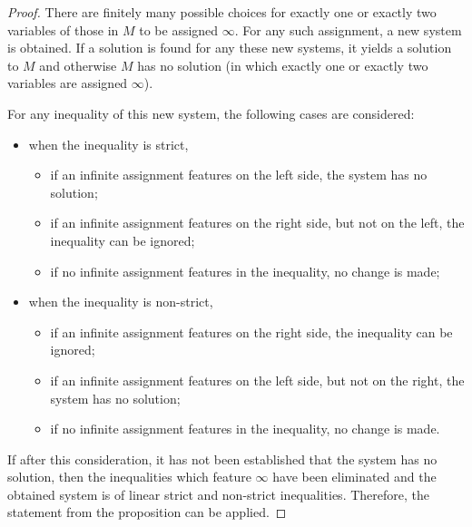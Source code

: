 \documentclass{article}
\begin{document}
\begin{proof}
  There are finitely many possible choices for exactly one or exactly two variables of those in $M$ to be assigned $\infty$. For any such assignment, a new system is obtained. If a solution is found for any these new systems, it yields a solution to $M$ and otherwise $M$ has no solution (in which exactly one or exactly two variables are assigned $\infty$).

  For any inequality of this new system, the following cases are considered:
  \begin{itemize}
  \item when the inequality is strict,
    \begin{itemize}
    \item if an infinite assignment features on the left side, the system has no solution;
    \item if an infinite assignment features on the right side, but not on the left, the inequality can be ignored;
    \item if no infinite assignment features in the inequality, no change is made;
    \end{itemize}
  \item when the inequality is non-strict,
    \begin{itemize}
    \item if an infinite assignment features on the right side, the inequality can be ignored;
    \item if an infinite assignment features on the left side, but not on the right, the system has no solution;
    \item if no infinite assignment features in the inequality, no change is made.
    \end{itemize}
  \end{itemize}
  If after this consideration, it has not been established that the system has no solution, then the inequalities which feature $\infty$ have been eliminated and the obtained system is of linear strict and non-strict inequalities. Therefore, the statement from the proposition can be applied.
\end{proof}
\end{document}
